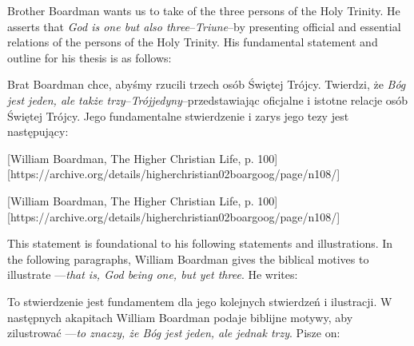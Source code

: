 Brother Boardman wants us to take  of the three persons of the Holy Trinity. He asserts that \textit{God is one but also three}–\textit{Triune}–by presenting official and essential relations of the persons of the Holy Trinity. His fundamental statement and outline for his thesis is as follows:


Brat Boardman chce, abyśmy rzucili  trzech osób Świętej Trójcy. Twierdzi, że \textit{Bóg jest jeden, ale także trzy}–\textit{Trójjedyny}–przedstawiając oficjalne i istotne relacje osób Świętej Trójcy. Jego fundamentalne stwierdzenie i zarys jego tezy jest następujący:


[William Boardman, The Higher Christian Life, p. 100][https://archive.org/details/higherchristian02boargoog/page/n108/]


[William Boardman, The Higher Christian Life, p. 100][https://archive.org/details/higherchristian02boargoog/page/n108/]


This statement is foundational to his following statements and illustrations. In the following paragraphs, William Boardman gives the biblical motives to illustrate —\textit{that is, God being one, but yet three}. He writes:


To stwierdzenie jest fundamentem dla jego kolejnych stwierdzeń i ilustracji. W następnych akapitach William Boardman podaje biblijne motywy, aby zilustrować —\textit{to znaczy, że Bóg jest jeden, ale jednak trzy}. Pisze on:


